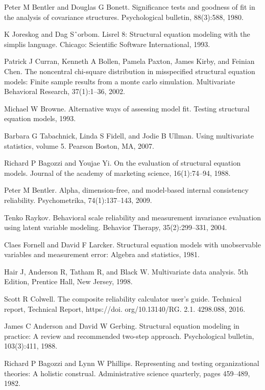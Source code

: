 \documentclass[letterpaper,12pt,titlepage,oneside,final,a4j,dvipdfmx]{book}
\begin{document}
\begin{thebibliography}{60}
  Peter M Bentler and Douglas G Bonett. Significance tests and goodness of fit in the analysis of covariance structures. Psychological bulletin, 88(3):588, 1980.

 K Joreskog and Dag Sˆorbom. Lisrel 8: Structural equation modeling with the simplis language. Chicago: Scientific Software International, 1993.

 Patrick J Curran, Kenneth A Bollen, Pamela Paxton, James Kirby, and Feinian Chen. The noncentral chi-square distribution in misspecified structural equation models: Finite sample results from a monte carlo simulation. Multivariate Behavioral Research, 37(1):1–36, 2002.

  Michael W Browne. Alternative ways of assessing model fit. Testing structural equation models, 1993.

 Barbara G Tabachnick, Linda S Fidell, and Jodie B Ullman. Using multivariate statistics, volume 5. Pearson Boston, MA, 2007.

  Richard P Bagozzi and Youjae Yi. On the evaluation of structural equation models. Journal of the academy of marketing science, 16(1):74–94, 1988.



 Peter M Bentler. Alpha, dimension-free, and model-based internal consistency reliability. Psychometrika, 74(1):137–143, 2009.

 Tenko Raykov. Behavioral scale reliability and measurement invariance evaluation using latent variable modeling. Behavior Therapy, 35(2):299–331, 2004.

  Claes Fornell and David F Larcker. Structural equation models with unobservable variables and measurement error: Algebra and statistics, 1981.

  Hair J, Anderson R, Tatham R, and Black W. Multivariate data analysis. 5th Edition, Prentice Hall, New Jersey, 1998.

 Scott R Colwell. The composite reliability calculator user's guide. Technical report, Technical Report, https://doi. org/10.13140/RG. 2.1. 4298.088, 2016.


 James C Anderson and David W Gerbing. Structural equation modeling in practice: A review and recommended two-step approach. Psychological bulletin, 103(3):411, 1988.


  Richard P Bagozzi and Lynn W Phillips. Representing and testing organizational theories: A holistic construal. Administrative science quarterly, pages 459–489, 1982.



\end{thebibliography}
\end{document}
